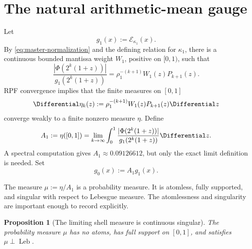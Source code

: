 \documentclass[11pt]{article}
\newtheorem{proposition}[theorem]{Proposition}
\theoremstyle{definition}
\theoremstyle{remark}
\newcommand{\Leb}{\operatorname{Leb}}
\newcommand{\Ecal}{\mathcal E}
\begin{document}
\section{The natural arithmetic-mean gauge}
\label{sec:natural-gauge}

Let
\begin{equation}
 g_1(x):=\Ecal_{\kappa_1}(x).
 \label{eq:g1}
\end{equation}
By \eqref{eq:master-normalization} and the defining relation for \(\kappa_1\),
there is a continuous bounded mantissa weight \(W_1\), positive on \([0,1)\),
such that
\begin{equation}
 \frac{|\Phi(2^k(1+z))|}{g_1(2^k(1+z))}
 =\rho_1^{-(k+1)}W_1(z)P_{k+1}(z).
 \label{eq:natural-shell-density}
\end{equation}
RPF convergence implies that the finite measures on \([0,1]\)
\begin{equation}
 \Differential\eta_k(z):=
 \rho_1^{-(k+1)}W_1(z)P_{k+1}(z)\Differential z
 \label{eq:etak}
\end{equation}
converge weakly to a finite nonzero measure \(\eta\).  Define
\begin{equation}
 A_1:=\eta([0,1])
 =\lim_{k\to\infty}\int_0^1\frac{|\Phi(2^k(1+z))|}
 {g_1(2^k(1+z))}\Differential z.
 \label{eq:A1}
\end{equation}
A spectral computation gives \(A_1\approx0.09126612\), but only the exact
limit definition is needed.  Set
\begin{equation}
 g_0(x):=A_1g_1(x).
 \label{eq:g0}
\end{equation}

The measure \(\mu:=\eta/A_1\) is a probability measure.  It is atomless,
fully supported, and singular with respect to Lebesgue measure.  The
atomlessness and singularity are important enough to record explicitly.

\begin{proposition}[The limiting shell measure is continuous singular]
\label{prop:singular}
The probability measure \(\mu\) has no atoms, has full support on \([0,1]\),
and satisfies \(\mu\perp\Leb\).
\end{proposition}
\end{document}
